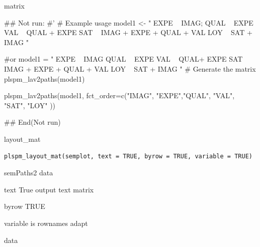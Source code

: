 \documentclass[a4paper]{book}
\begin{document}
%
\begin{Value}
matrix
\end{Value}
%
\begin{Examples}
\begin{ExampleCode}
## Not run: 
#'
# Example usage
model1 <- "
EXPE ~ IMAG; QUAL ~ EXPE
VAL ~ QUAL + EXPE
SAT ~ IMAG + EXPE + QUAL + VAL
LOY ~ SAT + IMAG
"

 #or
model1 = "
EXPE ~ IMAG
QUAL ~ EXPE
VAL ~  QUAL+ EXPE
SAT ~ IMAG + EXPE + QUAL + VAL
LOY ~ SAT + IMAG
"
# Generate the matrix
plspm_lav2paths(model1)

plspm_lav2paths(model1, fct_order=c("IMAG", "EXPE","QUAL", "VAL", "SAT", "LOY" ))



## End(Not run)

\end{ExampleCode}
\end{Examples}
%
\begin{Description}
layout\_mat
\end{Description}
%
\begin{Usage}
\begin{verbatim}
plspm_layout_mat(semplot, text = TRUE, byrow = TRUE, variable = TRUE)
\end{verbatim}
\end{Usage}
%
\begin{Arguments}
\begin{ldescription}
\item[\code{semplot}] semPaths2 data

\item[\code{text}] text True output text matrix

\item[\code{byrow}] byrow TRUE

\item[\code{variable}] variable is rownames adapt
\end{ldescription}
\end{Arguments}
%
\begin{Value}
data
\end{Value}
%
\end{document}

